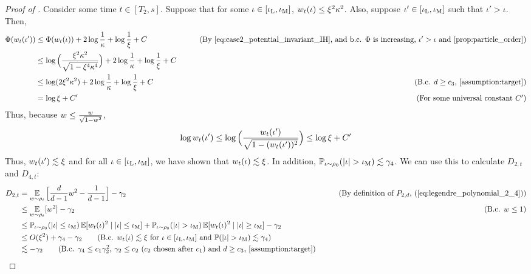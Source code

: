 \begin{proof}[Proof of ]
Consider some time $t \in [T_2, s]$. Suppose that for some $\iota \in [\iota_{\textup{L}}, \iota_{\textup{M}}]$, $w_t(\iota) \leq \xi^2 \kappa^2$. Also, suppose $\iota' \in [\iota_{\textup{L}}, \iota_{\textup{M}}]$ such that $\iota' > \iota$. Then, 
\begin{align}
\potential(\w_t(\iota'))
& \leq \potential(\w_t(\iota)) + 2 \log \frac{1}{\kappa} + \log \frac{1}{\xi} + C
& \tag{By \Cref{eq:case2_potential_invariant_IH}, and b.c. $\potential$ is increasing, $\iota' > \iota$ and \Cref{prop:particle_order}} \\
& \leq \log\Big(\frac{\xi^2 \kappa^2}{\sqrt{1 - \xi^4 \kappa^4}}\Big) + 2 \log\frac{1}{\kappa} + \log \frac{1}{\xi} + C \\
& \leq \log (2\xi^2\kappa^2) + 2 \log \frac{1}{\kappa} + \log \frac{1}{\xi} + C
& \tag{B.c. $d \geq c_3$, \Cref{assumption:target}} \\
& = \log \xi + C'
& \tag{For some universal constant $C'$}
\end{align}
Thus, because $w \leq \frac{w}{\sqrt{1 - w^2}}$,
\begin{align}
\log w_t(\iota')
 \leq \log\Big(\frac{w_t(\iota')}{\sqrt{1 - (w_t(\iota'))^2}} \Big)
 \leq \log \xi + C'
\end{align}
Thus, $w_t(\iota') \lesssim \xi$ and for all $\iota \in [\iota_{\textup{L}}, \iota_{\textup{M}}]$, we have shown that $w_t(\iota) \lesssim \xi$. In addition, $\mathbb{P}_{\iota \sim \rho_0} (|\iota| > \iota_{\textup{M}}) \lesssim \gamma_4$. We can use this to calculate $D_{2, t}$ and $D_{4, t}$:
\begin{align}
D_{2, t}
& = \E_{\w \sim \rho_t} \Big[ \frac{d}{d - 1} \w^2 - \frac{1}{d - 1}\Big] - \gamma_2
& \tag{By definition of $\PtwoD$, (\Cref{eq:legendre_polynomial_2_4})} \\
& \leq \E_{\w \sim \rho_t} [\w^2] - \gamma_2
& \tag{B.c. $w \leq 1$} \\
& \leq \Prob_{\iota \sim \rho_0} (|\iota| \leq \iotamid) \E[\w_t(\iota)^2 \mid |\iota| \leq \iotamid] + \Prob_{\iota \sim \rho_0} (|\iota| > \iotamid) \E[\w_t(\iota)^2 \mid |\iota| \geq \iotamid] - \gamma_2 \\
& \leq O(\xi^2) + \gamma_4 - \gamma_2
\tag{B.c. $\w_t(\iota) \lesssim \xi$ for $\iota \in [\iotaL, \iotamid]$ and $\Prob(|\iota| > \iotamid) \lesssim \gamma_4$} \\
& \lesssim -\gamma_2
\tag{B.c. $\gamma_4 \leq c_1 \gamma_2^2$, $\gamma_2 \leq c_2$ ($c_2$ chosen after $c_1$) and $d \geq c_3$, \Cref{assumption:target}}

\end{align}
\end{proof}
